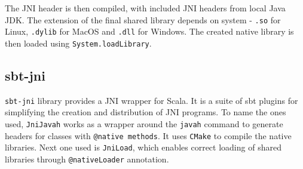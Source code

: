 The JNI header is then compiled, with included JNI headers from local Java JDK. The extension of the final shared library depends on system - \texttt{.so} for Linux, \texttt{.dylib} for MacOS and \texttt{.dll} for Windows. The created native library is then loaded using \texttt{System.loadLibrary}.


\subsection{sbt-jni}
\texttt{sbt-jni} library provides a JNI wrapper for Scala. It is a suite of sbt plugins for simplifying the creation and distribution of JNI programs. To name the ones used, \texttt{JniJavah} works as a wrapper around the \texttt{javah} command to generate headers for classes with \texttt{@native methods}. It uses \texttt{CMake} to compile the native libraries.
Next one used is \texttt{JniLoad}, which enables correct loading of shared libraries through \texttt{@nativeLoader} annotation. 

